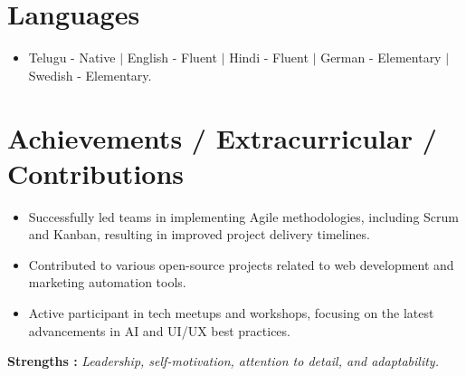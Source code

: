 \documentclass[letterpaper,11pt]{article}
\newcommand{\resumeItem}[1]{
  \item\small{
    {#1 \vspace{-2pt}}
  }
}
\newcommand{\resumeSubHeadingListStart}{\begin{itemize}[leftmargin=0.0in, label={}]}
\newcommand{\resumeSubHeadingListEnd}{\end{itemize}}
\newcommand{\resumeItemListStart}{\begin{itemize}}
\newcommand{\resumeItemListEnd}{\end{itemize}\vspace{-5pt}}
\begin{document}
\section*{Languages}
\begin{itemize}
  \item Telugu - Native $|$ English - Fluent $|$ Hindi - Fluent $|$ German - Elementary $|$ Swedish - Elementary.
\end{itemize}

\section{Achievements / Extracurricular / Contributions}
\resumeSubHeadingListStart
\resumeItemListStart
\resumeItem{Successfully led teams in implementing Agile methodologies, including Scrum and Kanban, resulting in improved project delivery timelines.}
\resumeItem{Contributed to various open-source projects related to web development and marketing automation tools.}
\resumeItem{Active participant in tech meetups and workshops, focusing on the latest advancements in AI and UI/UX best practices.}
\resumeItemListEnd

\resumeSubHeadingListEnd
\textbf{Strengths : }\emph{Leadership, self-motivation, attention to detail, and adaptability.} \\

\vspace{10pt}
\end{document}
